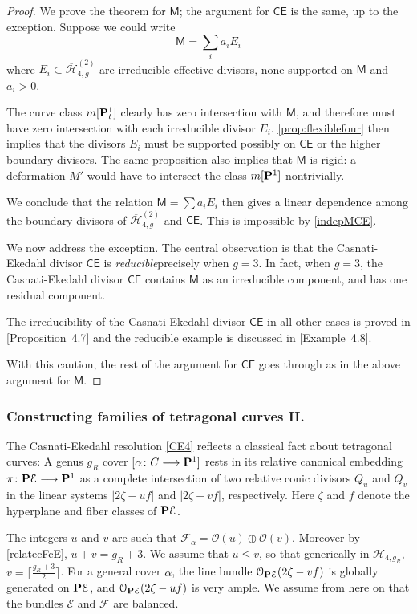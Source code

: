 \documentclass[reqno, 10 pt]{article}
\theoremstyle{definition}
\theoremstyle{remark}
\numberwithin{equation}{section}
\numberwithin{thm}{section}
\numberwithin{prop}{section}
\numberwithin{lem}{section}
\numberwithin{cor}{section}
\numberwithin{conj}{section}
\numberwithin{defn}{section}
\renewcommand{\H}{\mathcal H}
\newcommand{\sfCE}{{\mathsf {CE}}}
\newcommand{\sfM}{{\mathsf M}}
\newcommand{\cE}{{\mathcal E}}
\newcommand{\cF}{{\mathcal F}}
\newcommand{\cO}{{\mathcal O}}
\renewcommand{\P}{{\bf P}}
\renewcommand{\H}{{\mathcal{H}}}
\begin{document}
\begin{proof}
We prove the theorem for $\sfM$; the argument for $\sfCE$ is the same, up to the exception. Suppose we could write $$\sfM = \sum_{i} a_{i}E_{i}$$ where $E_{i} \subset \overline{\H}^{(2)}_{4,g}$ are irreducible effective divisors, none supported on $\sfM$ and $a_{i} > 0$. 

The curve class $m[\P^{1}_{t}]$ clearly has zero intersection with $\sfM$, and therefore must have zero intersection with each irreducible divisor $E_{i}$. \autoref{prop:flexiblefour} then implies that the divisors $E_{i}$ must be supported possibly on $\sfCE$ or the higher boundary divisors. The same proposition also implies that $\sfM$ is rigid: a deformation $M'$ would have to intersect the class $m[\P^{1}]$ nontrivially.


We conclude that the relation $\sfM = \sum a_{i}E_{i}$ then gives a linear dependence among the boundary divisors of $\overline{\H}^{(2)}_{4,g}$ and $\sfCE$. This is impossible by \autoref{indepMCE}.

We now address the exception. The central observation is that the Casnati-Ekedahl divisor $\sfCE$ is {\sl reducible}precisely when $g=3$. In fact, when $g=3$, the Casnati-Ekedahl divisor $\sfCE$ contains $\sfM$ as an irreducible component, and has one residual component. 

The irreducibility of the Casnati-Ekedahl divisor $\sfCE$ in all other cases is proved in \cite{dp:pic_345}[Proposition~4.7] and the reducible example is discussed in \cite{dp:pic_345}[Example~4.8]. 

With this caution, the rest of the argument for $\sfCE$ goes through as in the above argument for $\sfM$.
\end{proof}

\subsubsection{Constructing families of tetragonal curves II.} The Casnati-Ekedahl resolution \ref{CE4} reflects a classical fact about tetragonal curves: A genus $g_R$ cover $[\alpha \colon C \longrightarrow {\bf P}^1]$  rests in its relative canonical embedding $\pi \colon {\bf P}\mathcal{\cE} \longrightarrow {\bf P}^1$ as a complete intersection of two relative conic divisors $Q_u$ and $Q_v$ in the linear systems $|2\zeta -uf|$ and $|2\zeta - vf|$, respectively. Here $\zeta$ and $f$ denote the hyperplane and fiber classes of $\P \cE$.

  The integers $u$ and $v$ are such that $\cF_{\alpha} = \cO(u)\oplus \cO(v)$. Moreover by \autoref{relatecFcE}, $u+v = g_{R}+3.$ We assume that $u\leq v$, so that generically in $\H_{4,g_{R}}$,  $v = \lceil{\frac{g_R+3}{2}\rceil}$.  For a general cover $\alpha$, the line bundle $\cO_{\P\cE}(2\zeta - vf)$ is  globally generated on $\bf{P}\cE$, and $\cO_{\P\cE}(2\zeta - uf)$ is  very ample.  We assume from here on that the bundles $\cE$ and $\cF$ are balanced.
\end{document}

